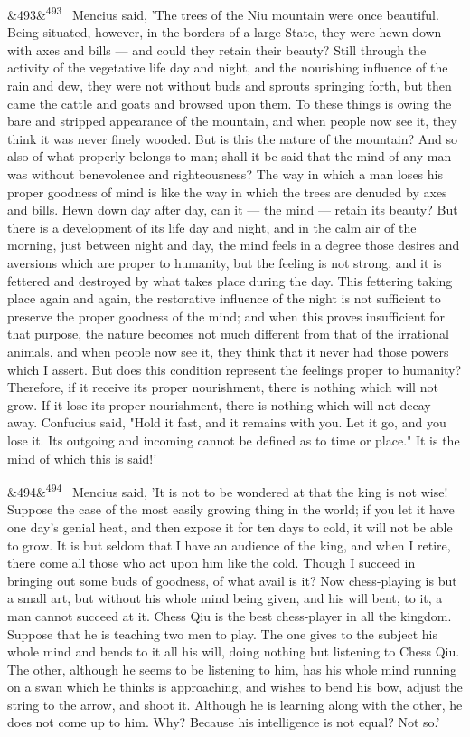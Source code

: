 \documentclass[12pt]{article}
\newcommand{\para}[1][]{\par\noindent\ifx&#1&\else\textsuperscript{\footnotesize #1}~\fi}
\begin{document}
\para[493] Mencius said, 'The trees of the Niu mountain were once beautiful. Being situated, however, in the borders of a large State, they were hewn down with axes and bills --- and could they retain their beauty? Still through the activity of the vegetative life day and night, and the nourishing influence of the rain and dew, they were not without buds and sprouts springing forth, but then came the cattle and goats and browsed upon them. To these things is owing the bare and stripped appearance of the mountain, and when people now see it, they think it was never finely wooded. But is this the nature of the mountain? And so also of what properly belongs to man; shall it be said that the mind of any man was without benevolence and righteousness? The way in which a man loses his proper goodness of mind is like the way in which the trees are denuded by axes and bills. Hewn down day after day, can it --- the mind --- retain its beauty? But there is a development of its life day and night, and in the calm air of the morning, just between night and day, the mind feels in a degree those desires and aversions which are proper to humanity, but the feeling is not strong, and it is fettered and destroyed by what takes place during the day. This fettering taking place again and again, the restorative influence of the night is not sufficient to preserve the proper goodness of the mind; and when this proves insufficient for that purpose, the nature becomes not much different from that of the irrational animals, and when people now see it, they think that it never had those powers which I assert. But does this condition represent the feelings proper to humanity? Therefore, if it receive its proper nourishment, there is nothing which will not grow. If it lose its proper nourishment, there is nothing which will not decay away. Confucius said, "Hold it fast, and it remains with you. Let it go, and you lose it. Its outgoing and incoming cannot be defined as to time or place." It is the mind of which this is said!'

\para[494] Mencius said, 'It is not to be wondered at that the king is not wise! Suppose the case of the most easily growing thing in the world; if you let it have one day's genial heat, and then expose it for ten days to cold, it will not be able to grow. It is but seldom that I have an audience of the king, and when I retire, there come all those who act upon him like the cold. Though I succeed in bringing out some buds of goodness, of what avail is it? Now chess-playing is but a small art, but without his whole mind being given, and his will bent, to it, a man cannot succeed at it. Chess Qiu is the best chess-player in all the kingdom. Suppose that he is teaching two men to play. The one gives to the subject his whole mind and bends to it all his will, doing nothing but listening to Chess Qiu. The other, although he seems to be listening to him, has his whole mind running on a swan which he thinks is approaching, and wishes to bend his bow, adjust the string to the arrow, and shoot it. Although he is learning along with the other, he does not come up to him. Why? Because his intelligence is not equal? Not so.'
\end{document}
